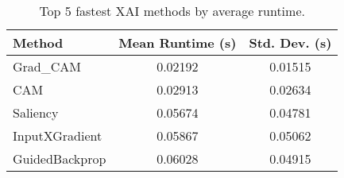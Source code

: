 \begin{table}[ht]
\centering
\begin{tabular}{lcc}
\hline
Method & Mean Runtime (s) & Std. Dev. (s) \\
\hline
Grad_CAM & 0.02192 & 0.01515 \\
CAM & 0.02913 & 0.02634 \\
Saliency & 0.05674 & 0.04781 \\
InputXGradient & 0.05867 & 0.05062 \\
GuidedBackprop & 0.06028 & 0.04915 \\
\hline
\end{tabular}
\caption{Top 5 fastest XAI methods by average runtime.}
\label{tab:fastest_runtime}
\end{table}
